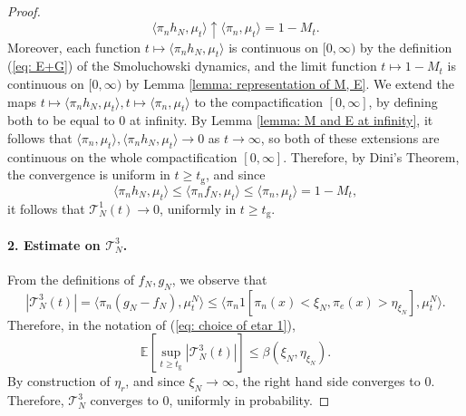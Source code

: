 \begin{proof}
\begin{equation}
       \langle \pi_n h_N, \mu_t\rangle \uparrow \langle \pi_n, \mu_t\rangle =1-M_t.
   \end{equation} Moreover, each function $t\mapsto \langle \pi_n h_N, \mu_t\rangle$ is continuous on $[0,\infty)$ by the definition (\ref{eq: E+G}) of the Smoluchowski dynamics, and the limit function $t\mapsto 1-M_t$ is continuous on $[0,\infty)$ by Lemma \ref{lemma: representation of M, E}.  We extend the maps $t\mapsto \langle \pi_n h_N, \mu_t\rangle, t\mapsto \langle \pi_n, \mu_t\rangle$ to the compactification $[0,\infty]$, by defining both to be equal to $0$ at infinity. By Lemma \ref{lemma: M and E at infinity}, it follows that $\langle \pi_n, \mu_t\rangle, \langle \pi_n h_N, \mu_t\rangle \rightarrow 0$ as $t\rightarrow \infty$, so both of these extensions are continuous on the whole compactification $[0,\infty].$  Therefore, by Dini's Theorem, the convergence is uniform in $t\geq t_\mathrm{g}$, and since \begin{equation}
       \langle \pi_n h_N, \mu_t\rangle \le \langle \pi_n f_N, \mu_t \rangle \le \langle \pi_n, \mu_t\rangle = 1-M_t, 
   \end{equation} it follows that $\mathcal{T}^1_N(t) \rightarrow 0$, uniformly in $t\geq t_\mathrm{g}$.
   \paragraph{2. Estimate on $\mathcal{T}^3_N$.} From the definitions of $f_N, g_N$, we observe that \begin{equation}
       |\mathcal{T}^3_N(t)|=\langle \pi_n(g_N-f_N), \mu^N_t\rangle \le  \langle \pi_n 1[\pi_n(x)<\xi_N, \pi_e(x)>\eta_{\xi_N}], \mu^N_t\rangle.
   \end{equation} Therefore, in the notation of (\ref{eq: choice of etar 1}), \begin{equation}
       \mathbb{E}\left[\sup_{t\geq t_\mathrm{g}} |\mathcal{T}^3_N(t)|\right] \leq \beta(\xi_N, \eta_{\xi_N}).
   \end{equation} By construction of $\eta_r$, and since $\xi_N \rightarrow \infty$, the right hand side converges to $0$. Therefore, $\mathcal{T}^3_N$ converges to $0$, uniformly in probability.

\end{proof}
